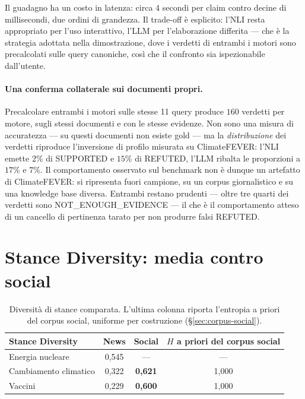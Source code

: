 \documentclass[11pt,a4paper]{report}
\begin{document}
Il guadagno ha un costo in latenza: circa $4$ secondi per claim contro decine di millisecondi, due
ordini di grandezza. Il trade-off è esplicito: l'NLI resta appropriato per l'uso interattivo, l'LLM
per l'elaborazione differita --- che è la strategia adottata nella dimostrazione, dove i verdetti di
entrambi i motori sono precalcolati sulle query canoniche, così che il confronto sia ispezionabile
dall'utente.

\paragraph{Una conferma collaterale sui documenti propri.} Precalcolare entrambi i motori sulle
stesse 11 query produce $160$ verdetti per motore, sugli stessi documenti e con le stesse evidenze.
Non sono una misura di accuratezza --- su questi documenti non esiste gold --- ma la
\emph{distribuzione} dei verdetti riproduce l'inversione di profilo misurata su ClimateFEVER: l'NLI
emette $2\%$ di SUPPORTED e $15\%$ di REFUTED, l'LLM ribalta le proporzioni a $17\%$ e $7\%$. Il
comportamento osservato sul benchmark non è dunque un artefatto di ClimateFEVER: si ripresenta fuori
campione, su un corpus giornalistico e su una knowledge base diversa. Entrambi restano prudenti ---
oltre tre quarti dei verdetti sono NOT\_ENOUGH\_EVIDENCE --- il che è il comportamento atteso di un
cancello di pertinenza tarato per non produrre falsi REFUTED.

\section{Stance Diversity: media contro social}\label{sec:ris-diversity}

\begin{table}[t]
\centering
\small
\begin{tabular}{lccc}
\toprule
\textbf{Stance Diversity} & \textbf{News} & \textbf{Social} & $H$ \textbf{a priori del corpus social} \\
\midrule
Energia nucleare & 0,545 & --- & --- \\
Cambiamento climatico & 0,322 & \textbf{0,621} & 1,000 \\
Vaccini & 0,229 & \textbf{0,600} & 1,000 \\
\bottomrule
\end{tabular}
\caption{Diversità di stance comparata. L'ultima colonna riporta l'entropia a priori del corpus
social, uniforme per costruzione (\S\ref{sec:corpus-social}).}
\label{tab:div}
\end{table}
\end{document}
